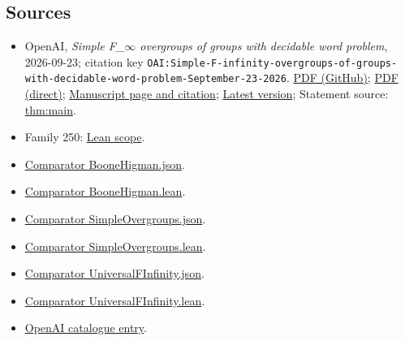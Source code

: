\documentclass[11pt]{article}
\begin{document}
\subsection{Sources}
\begin{itemize}
\item OpenAI, \emph{Simple F\_\(\infty\) overgroups of groups with decidable word problem}, 2026-09-23; citation key \texttt{OAI:Simple-F-infinity-overgroups-of-groups-with-decidable-word-problem-September-23-2026}. \href{https://github.com/openai/math/blob/adc7f1241b42e322a6451854ab7e4b4c146bf78a/preprints/Simple-F-infinity-overgroups-of-groups-with-decidable-word-problem-September-23-2026/paper.pdf}{PDF (GitHub)}; \href{https://github.com/openai/math/raw/adc7f1241b42e322a6451854ab7e4b4c146bf78a/preprints/Simple-F-infinity-overgroups-of-groups-with-decidable-word-problem-September-23-2026/paper.pdf}{PDF (direct)}; \href{https://github.com/openai/math/blob/adc7f1241b42e322a6451854ab7e4b4c146bf78a/preprints/Simple-F-infinity-overgroups-of-groups-with-decidable-word-problem-September-23-2026/README.md}{Manuscript page and citation}; \href{https://github.com/openai/math/blob/main/preprints/Simple-F-infinity-overgroups-of-groups-with-decidable-word-problem-September-23-2026/paper.pdf}{Latest version}; Statement source: \href{https://github.com/openai/math/blob/adc7f1241b42e322a6451854ab7e4b4c146bf78a/preprints/Simple-F-infinity-overgroups-of-groups-with-decidable-word-problem-September-23-2026/build/sections/introduction.tex\#L33}{thm:main}.
\item Family 250: \href{https://github.com/openai/math/blob/adc7f1241b42e322a6451854ab7e4b4c146bf78a/lean/docs/250.md}{Lean scope}.
\item \href{https://github.com/openai/math/blob/adc7f1241b42e322a6451854ab7e4b4c146bf78a/lean/ComparatorChallenges/BooneHigman.json}{Comparator BooneHigman.json}.
\item \href{https://github.com/openai/math/blob/adc7f1241b42e322a6451854ab7e4b4c146bf78a/lean/ComparatorChallenges/BooneHigman.lean}{Comparator BooneHigman.lean}.
\item \href{https://github.com/openai/math/blob/adc7f1241b42e322a6451854ab7e4b4c146bf78a/lean/ComparatorChallenges/SimpleOvergroups.json}{Comparator SimpleOvergroups.json}.
\item \href{https://github.com/openai/math/blob/adc7f1241b42e322a6451854ab7e4b4c146bf78a/lean/ComparatorChallenges/SimpleOvergroups.lean}{Comparator SimpleOvergroups.lean}.
\item \href{https://github.com/openai/math/blob/adc7f1241b42e322a6451854ab7e4b4c146bf78a/lean/ComparatorChallenges/UniversalFInfinity.json}{Comparator UniversalFInfinity.json}.
\item \href{https://github.com/openai/math/blob/adc7f1241b42e322a6451854ab7e4b4c146bf78a/lean/ComparatorChallenges/UniversalFInfinity.lean}{Comparator UniversalFInfinity.lean}.
\item \href{https://github.com/openai/math/blob/adc7f1241b42e322a6451854ab7e4b4c146bf78a/CONTENTS.md}{OpenAI catalogue entry}.
\end{itemize}
\end{document}
